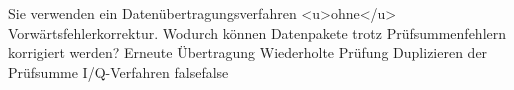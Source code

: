     {Sie verwenden ein Datenübertragungsverfahren <u>ohne</u> Vorwärtsfehlerkorrektur. Wodurch können Datenpakete trotz Prüfsummenfehlern korrigiert werden?}
    {Erneute Übertragung}
    {Wiederholte Prüfung}
    {Duplizieren der Prüfsumme}
    {I/Q-Verfahren}
    {false}{false}